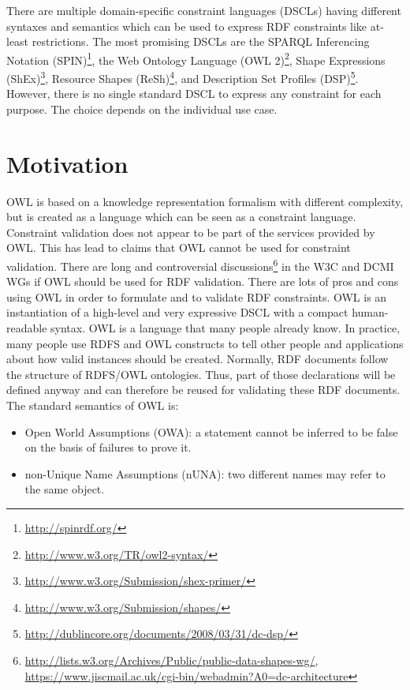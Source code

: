 \documentclass{llncs}
\newcommand{\tb}[1]{\todo[size=\small, color=green!40]{\textbf{Thomas:} #1}}
\begin{document}
There are multiple domain-specific constraint languages (DSCLs) having different syntaxes and semantics which can be used to express RDF constraints like at-least restrictions.
The most promising DSCLs are 
the SPARQL Inferencing Notation (SPIN)\footnote{\url{http://spinrdf.org/}}, 
the Web Ontology Language (OWL 2)\footnote{\url{http://www.w3.org/TR/owl2-syntax/}}, 
Shape Expressions (ShEx)\footnote{\url{http://www.w3.org/Submission/shex-primer/}}, 
Resource Shapes (ReSh)\footnote{\url{http://www.w3.org/Submission/shapes/}}, 
and Description Set Profiles (DSP)\footnote{\url{http://dublincore.org/documents/2008/03/31/dc-dsp/}}.
However, there is no single standard DSCL to express any constraint for each purpose.
The choice depends on the individual use case.

\section{Motivation}

\tb{1 simple example in motivation section}

OWL is based on a knowledge representation formalism with different complexity, but is created as a language which can be seen as a constraint language.
Constraint validation does not appear to be part of the services provided by OWL.  
This has lead to claims that OWL cannot be used for constraint validation. 
There are long and controversial discussions\footnote{\url{http://lists.w3.org/Archives/Public/public-data-shapes-wg/}, \url{https://www.jiscmail.ac.uk/cgi-bin/webadmin?A0=dc-architecture}} in the W3C and DCMI WGs if OWL should be used for RDF validation.
There are lots of pros and cons using OWL in order to formulate and to validate RDF constraints.
OWL is an instantiation of a high-level and very expressive DSCL with a compact human-readable syntax.
OWL is a language that many people already know.
In practice, many people use RDFS and OWL constructs to tell other people and applications about how valid instances should be created.
Normally, RDF documents follow the structure of RDFS/OWL ontologies. 
Thus, part of those declarations will be defined anyway and can therefore be reused for validating these RDF documents.
The standard semantics of OWL is:

\begin{itemize}
	\item Open World Assumptions (OWA): a statement cannot be inferred to be false on the basis of failures to prove it.
  \item non-Unique Name Assumptions (nUNA): two different names may refer to the same object.
\end{itemize}
\end{document}
